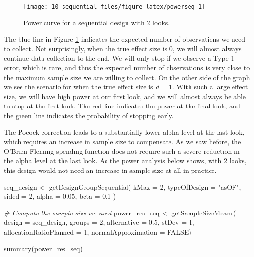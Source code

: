 \documentclass[
  oneside]{krantz}
\makeatletter
\newenvironment{Shaded}{\begin{snugshade}}{\end{snugshade}}
\newcommand{\AttributeTok}[1]{\textcolor[rgb]{0.61,0.61,0.61}{#1}}
\newcommand{\CommentTok}[1]{\textcolor[rgb]{0.37,0.37,0.37}{\textit{#1}}}
\newcommand{\ConstantTok}[1]{\textcolor[rgb]{0,0,0}{#1}}
\newcommand{\DecValTok}[1]{\textcolor[rgb]{0.06,0.06,0.06}{#1}}
\newcommand{\FloatTok}[1]{\textcolor[rgb]{0.06,0.06,0.06}{#1}}
\newcommand{\FunctionTok}[1]{\textcolor[rgb]{0,0,0}{#1}}
\newcommand{\NormalTok}[1]{#1}
\newcommand{\OtherTok}[1]{\textcolor[rgb]{0.37,0.37,0.37}{#1}}
\newcommand{\StringTok}[1]{\textcolor[rgb]{0.5,0.5,0.5}{#1}}
\newenvironment{kframe}{%
\medskip{}
\setlength{\fboxsep}{.8em}
 \def\at@end@of@kframe{}%
 \ifinner\ifhmode%
  \def\at@end@of@kframe{\end{minipage}}%
  \begin{minipage}{\columnwidth}%
 \fi\fi%
 \def\FrameCommand##1{\hskip\@totalleftmargin \hskip-\fboxsep
 \colorbox{shadecolor}{##1}\hskip-\fboxsep
     \hskip-\linewidth \hskip-\@totalleftmargin \hskip\columnwidth}%
 \MakeFramed {\advance\hsize-\width
   \@totalleftmargin\z@ \linewidth\hsize
   \@setminipage}}%
 {\par\unskip\endMakeFramed%
 \at@end@of@kframe}
\renewenvironment{Shaded}{\begin{kframe}}{\end{kframe}}
\makeatother
\begin{document}
\begin{figure}

{\centering \texttt{[image: 10-sequential\_files/figure-latex/powerseq-1]} 

}

\caption{Power curve for a sequential design with 2 looks.}\label{fig:powerseq}
\end{figure}

The blue line in Figure \ref{fig:powerseq} indicates the expected number of observations we need to collect. Not surprisingly, when the true effect size is 0, we will almost always continue data collection to the end. We will only stop if we observe a Type 1 error, which is rare, and thus the expected number of observations is very close to the maximum sample size we are willing to collect. On the other side of the graph we see the scenario for when the true effect size is \emph{d} = 1. With such a large effect size, we will have high power at our first look, and we will almost always be able to stop at the first look. The red line indicates the power at the final look, and the green line indicates the probability of stopping early.

The Pocock correction leads to a substantially lower alpha level at the last look, which requires an increase in sample size to compensate. As we saw before, the O'Brien-Fleming spending function does not require such a severe reduction in the alpha level at the last look. As the power analysis below shows, with 2 looks, this design would not need an increase in sample size at all in practice.

\begin{Shaded}
\begin{Highlighting}[]
\NormalTok{seq\_design }\OtherTok{\textless{}{-}} \FunctionTok{getDesignGroupSequential}\NormalTok{(}
  \AttributeTok{kMax =} \DecValTok{2}\NormalTok{,}
  \AttributeTok{typeOfDesign =} \StringTok{"asOF"}\NormalTok{,}
  \AttributeTok{sided =} \DecValTok{2}\NormalTok{,}
  \AttributeTok{alpha =} \FloatTok{0.05}\NormalTok{,}
  \AttributeTok{beta =} \FloatTok{0.1}
\NormalTok{  )}

\CommentTok{\# Compute the sample size we need}
\NormalTok{power\_res\_seq }\OtherTok{\textless{}{-}} \FunctionTok{getSampleSizeMeans}\NormalTok{(}
  \AttributeTok{design =}\NormalTok{ seq\_design,}
  \AttributeTok{groups =} \DecValTok{2}\NormalTok{,}
  \AttributeTok{alternative =} \FloatTok{0.5}\NormalTok{, }
  \AttributeTok{stDev =} \DecValTok{1}\NormalTok{, }
  \AttributeTok{allocationRatioPlanned =} \DecValTok{1}\NormalTok{,}
  \AttributeTok{normalApproximation =} \ConstantTok{FALSE}\NormalTok{)}

\FunctionTok{summary}\NormalTok{(power\_res\_seq)}
\end{Highlighting}
\end{Shaded}
\end{document}
